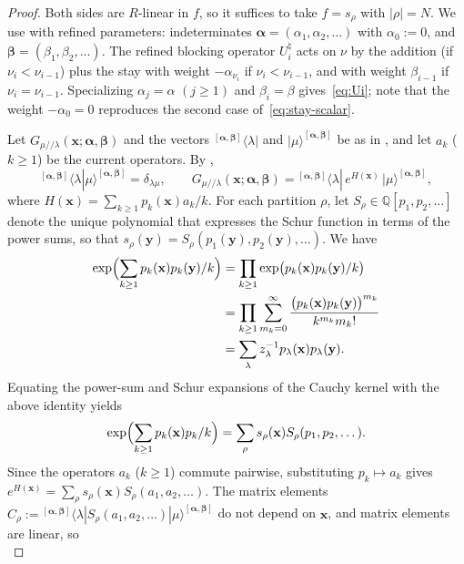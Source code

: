 \documentclass[11pt]{amsart}
\DeclareRobustCommand{\S}{\ensuremath{\mathsection}}
\numberwithin{equation}{section}
\theoremstyle{definition}
\theoremstyle{remark}
\newcommand{\bbeta}{\boldsymbol\beta}
\newcommand{\balpha}{\boldsymbol\alpha}
\newcommand{\sk}{/\!\!/}
\newcommand{\QQ}{\mathbb Q}
\begin{document}
\begin{proof}
Both sides are $R$-linear in $f$, so it suffices to take $f=s_\rho$ with
$|\rho|=N$. We use \cite{IMS25} with refined parameters: indeterminates
$\balpha=(\alpha_1,\alpha_2,\dots)$ with $\alpha_0:=0$, and
$\bbeta=(\beta_1,\beta_2,\dots)$. The refined blocking operator
$U^{\natural}_i$ acts on $\nu$ by the addition (if $\nu_i<\nu_{i-1}$) plus
the stay with weight $-\alpha_{\nu_i}$ if $\nu_i<\nu_{i-1}$, and with weight
$\beta_{i-1}$ if $\nu_i=\nu_{i-1}$. Specializing $\alpha_j=\alpha$ $(j\geq1)$ and
$\beta_i=\beta$ gives~\eqref{eq:Ui}; note that the weight $-\alpha_0=0$
reproduces the second case of~\eqref{eq:stay-scalar}.

Let
$G_{\mu\sk\lambda}(\mathbf x;\balpha,\bbeta)$ and the vectors
${}^{[\balpha,\bbeta]}\langle\lambda|$ and $|\mu\rangle^{[\balpha,\bbeta]}$ be as
in \cite[\S2.3]{IMS25}, and let $a_k$ ($k\geq1$) be the current operators.
By \cite[(2.6), (2.7)]{IMS25},
\[
 {}^{[\balpha,\bbeta]}\langle\lambda|\mu\rangle^{[\balpha,\bbeta]}=\delta_{\lambda\mu},
 \qquad
 G_{\mu\sk\lambda}(\mathbf x;\balpha,\bbeta)
 ={}^{[\balpha,\bbeta]}\langle\lambda|\,e^{H(\mathbf x)}\,|\mu\rangle^{[\balpha,\bbeta]},
\]
where $H(\mathbf x)=\sum_{k\geq1}p_k(\mathbf x)a_k/k$. For each partition
$\rho$, let $S_\rho\in\QQ[p_1,p_2,\dots]$ denote the unique polynomial that
expresses the Schur function in terms of the power sums, so that
$s_\rho(\mathbf y)=S_\rho(p_1(\mathbf y),p_2(\mathbf y),\dots)$. We have
\begin{align*}
 \exp\Bigl(\sum_{k\geq1}p_k(\mathbf x)p_k(\mathbf y)/k\Bigr)
 &=\prod_{k\geq1}\exp\bigl(p_k(\mathbf x)p_k(\mathbf y)/k\bigr)\\
 &=\prod_{k\geq1}\sum_{m_k=0}^{\infty}
   \frac{\bigl(p_k(\mathbf x)p_k(\mathbf y)\bigr)^{m_k}}{k^{m_k}m_k!}\\
 &=\sum_{\lambda}z_{\lambda}^{-1}p_{\lambda}(\mathbf{x})p_{\lambda}(\mathbf{y}).
\end{align*}
Equating the power-sum and Schur expansions of the Cauchy kernel
\cite[Ch.~I, (4.1) and (4.3)]{Macdonald} with the above identity yields
\[
 \exp\Bigl(\sum_{k\geq1}p_k(\mathbf x)p_k/k\Bigr)
 =\sum_\rho s_\rho(\mathbf x)S_\rho(p_1,p_2,\dots).
\]
Since the operators $a_k$ ($k\geq1$) commute pairwise, substituting
$p_k\mapsto a_k$ gives
$e^{H(\mathbf x)}=\sum_\rho s_\rho(\mathbf x)S_\rho(a_1,a_2,\dots)$. The matrix
elements
$C_\rho:={}^{[\balpha,\bbeta]}\langle\lambda|S_\rho(a_1,a_2,\dots)|\mu\rangle^{[\balpha,\bbeta]}$
do not depend on $\mathbf x$, and matrix elements are linear, so
\[
\]
\end{proof}
\end{document}
